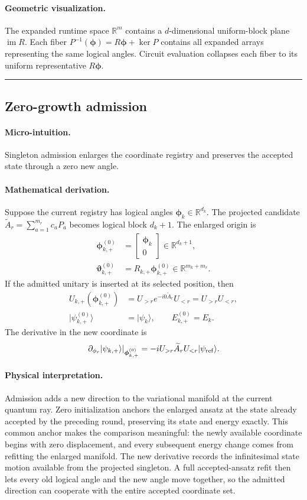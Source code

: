 \documentclass[10pt,twocolumn]{article}
\newcommand{\ket}[1]{\lvert #1\rangle}
\newcommand{\R}{\mathbb R}
\newcommand{\conceptbreak}{%
  \par\medskip\noindent
  {\color{black!30}\rule{\columnwidth}{0.35pt}}%
  \par\medskip}
\newcommand{\micro}{\paragraph{Micro-intuition.}}
\newcommand{\mathderiv}{\paragraph{Mathematical derivation.}}
\newcommand{\physical}{\paragraph{Physical interpretation.}}
\newcommand{\geometryblock}{\paragraph{Geometric visualization.}}
\begin{document}
\geometryblock The expanded runtime space \(\R^m\) contains a \(d\)-dimensional
uniform-block plane \(\operatorname{im}R\). Each fiber
\(P^{-1}(\bm\phi)=R\bm\phi+\ker P\) contains all expanded arrays representing
the same logical angles. Circuit evaluation collapses each fiber to its uniform
representative \(R\bm\phi\).

\conceptbreak

\subsection*{Zero-growth admission}

\micro Singleton admission enlarges the coordinate registry and preserves the
accepted state through a zero new angle.

\mathderiv Suppose the current registry has logical angles
\(\bm\phi_k\in\R^{d_k}\). The projected candidate
\(\widetilde A_r=\sum_{a=1}^{m_r}c_aP_a\) becomes logical block \(d_k+1\).
The enlarged origin is
\begin{align}
\bm\phi_{k,+}^{(0)}
&=\begin{bmatrix}\bm\phi_k\\0\end{bmatrix}
\in\R^{d_k+1},\nonumber\\
\bm\vartheta_{k,+}^{(0)}
&=R_{k,+}\bm\phi_{k,+}^{(0)}
\in\R^{m_k+m_r}.
\label{eq:zero-growth-origin}
\end{align}
If the admitted unitary is inserted at its selected position, then
\begin{align}
U_{k,+}(\bm\phi_{k,+}^{(0)})
&=U_{>r}e^{-i0\widetilde A_r}U_{<r}
=U_{>r}U_{<r},\nonumber\\
\ket{\psi_{k,+}^{(0)}}&=\ket{\psi_k},\qquad
E_{k,+}^{(0)}=E_k.
\label{eq:zero-growth-state}
\end{align}
The derivative in the new coordinate is
\begin{equation}
\left.\partial_{\phi_r}\ket{\psi_{k,+}}\right|_{\bm\phi_{k,+}^{(0)}}
=-iU_{>r}\widetilde A_rU_{<r}\ket{\psi_{\rm ref}}.
\label{eq:new-candidate-tangent}
\end{equation}

\physical Admission adds a new direction to the variational manifold at the
current quantum ray. Zero initialization anchors the enlarged ansatz at the
state already accepted by the preceding round, preserving its state and energy
exactly. This common anchor makes the comparison meaningful: the newly
available coordinate begins with zero displacement, and every subsequent
energy change comes from refitting the enlarged manifold. The new derivative
records the infinitesimal state motion available from the projected singleton.
A full accepted-ansatz refit then lets every old logical angle and the new
angle move together, so the admitted direction can cooperate with the entire
accepted coordinate set.
\end{document}
